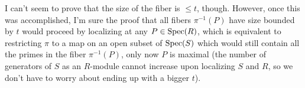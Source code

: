 \documentclass[11pt]{article}
\begin{document}
I can't seem to prove that the size of the fiber is $\leq t$, though. However, once this was accomplished, I'm sure the proof that all fibers $\pi^{-1}(P)$ have size bounded by $t$ would proceed by localizing at any $P\in\operatorname{Spec}(R)$, which is equivalent to restricting $\pi$ to a map on an open subset of $\operatorname{Spec}(S)$ which would still contain all the primes in the fiber $\pi^{-1}(P)$, only now $P$ is maximal (the number of generators of $S$ as an $R$-module cannot increase upon localizing $S$ and $R$, so we don't have to worry about ending up with a bigger $t$).

\end{document}
